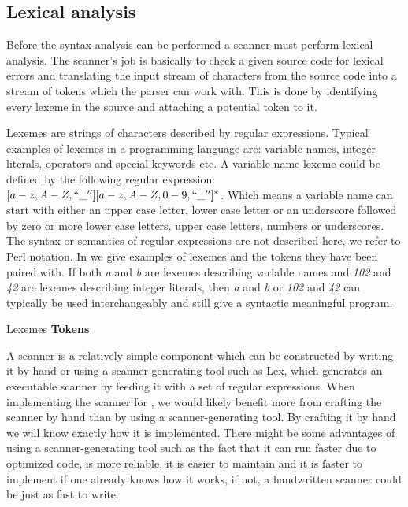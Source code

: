 \subsection{Lexical analysis}
\label{sec:lexicalanalysis}
Before the syntax analysis can be performed a scanner must perform lexical
analysis. The scanner's job is basically to check a given source code for
lexical errors and translating the input stream of characters from the source
code into a stream of tokens which the parser can work with. This is done by
identifying every lexeme in the source and attaching a potential token to
it\cite[p. 57]{fischer2009}.

Lexemes are strings of characters described by regular expressions.  Typical
examples of lexemes in a programming language are: variable names, integer
literals, operators and special keywords etc. A variable name lexeme could be
defined by the following regular expression: $[a-z, A-Z, ``\_''][a-z, A-Z, 0-9,
``\_'']^*$. Which means a variable name can start with either an upper case
letter, lower case letter or an underscore followed by zero or more lower case
letters, upper case letters, numbers or underscores. The syntax or semantics of
regular expressions are not described here, we refer to Perl
notation\cite{perlRegex}. In  we give examples of
lexemes and the tokens they have been paired with. If both \textit{a} and
\textit{b} are lexemes describing variable names and \textit{102} and
\textit{42} are lexemes describing integer literals, then \textit{a} and
\textit{b} or \textit{102} and \textit{42} can typically be used interchangeably
and still give a syntactic meaningful program.

		             {               }
       {Lexemes             }{\textbf{Tokens} } {
}

A scanner is a relatively simple component which can be constructed by writing
it by hand or using a scanner-generating tool such as Lex, which generates an
executable scanner by feeding it with a set of regular expressions. When
implementing the scanner for \productname{}, we would likely benefit more from
crafting the scanner by hand than by using a scanner-generating tool. By
crafting it by hand we will know exactly how it is implemented. There might be
some advantages of using a scanner-generating tool such as the fact that it can
run faster due to optimized code, is more reliable, it is easier to maintain and
it is faster to implement if one already knows how it works, if not, a
handwritten scanner could be just as fast to write.
